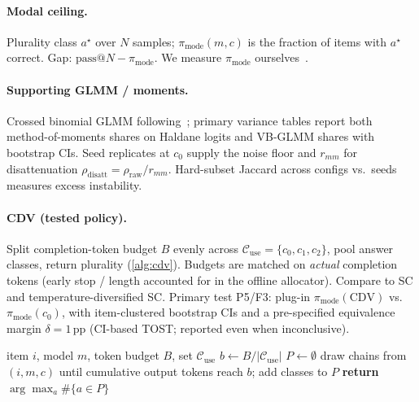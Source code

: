 \documentclass{article}
\newcommand{\pmode}{\pi_{\mathrm{mode}}}
\newcommand{\rdis}{\rho_{\mathrm{disatt}}}
\theoremstyle{plain}
\theoremstyle{definition}
\theoremstyle{remark}
\begin{document}
\paragraph{Modal ceiling.}
Plurality class $a^\star$ over $N$ samples; $\pmode(m,c)$ is the fraction of
items with $a^\star$ correct. Gap: $\mathrm{pass@}N-\pmode$. We measure
$\pmode$ ourselves~\citep{brown2024monkeys,bay2026modal}.

\paragraph{Supporting GLMM / moments.}
Crossed binomial GLMM following~\citet{tee2026,prompteval2024}; primary variance
tables report both method-of-moments shares on Haldane logits and VB-GLMM shares
with bootstrap CIs. Seed replicates at $c_0$ supply the noise floor and $r_{mm}$
for disattenuation $\rdis=\rho_{\mathrm{raw}}/r_{mm}$. Hard-subset Jaccard across
configs vs.\ seeds measures excess instability.

\paragraph{CDV (tested policy).}
Split completion-token budget $B$ evenly across
$\mathcal{C}_{\mathrm{use}}=\{c_0,c_1,c_2\}$, pool answer classes, return plurality
(\cref{alg:cdv}). Budgets are matched on \emph{actual} completion tokens
(early stop / length accounted for in the offline allocator). Compare to SC and
temperature-diversified SC. Primary test P5/F3: plug-in $\pmode(\mathrm{CDV})$
vs.\ $\pmode(c_0)$, with item-clustered bootstrap CIs and a pre-specified
equivalence margin $\delta{=}1$\,pp (CI-based TOST; reported even when
inconclusive).

\begin{algorithm}[t]
\caption{Configuration-Diversified Voting (CDV)}
\label{alg:cdv}
\begin{algorithmic}[1]
\REQUIRE item $i$, model $m$, token budget $B$, set $\mathcal{C}_{\mathrm{use}}$
\STATE $b \gets B / |\mathcal{C}_{\mathrm{use}}|$
\STATE $P \gets \emptyset$
  \STATE draw chains from $(i,m,c)$ until cumulative output tokens reach $b$; add classes to $P$
\ENDFOR
\STATE \textbf{return} $\arg\max_{a}\#\{a\in P\}$
\end{algorithmic}
\end{algorithm}

\end{document}

